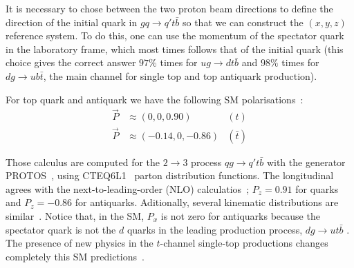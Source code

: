 It is necessary to chose between the two proton beam directions to define the direction of the initial quark in $gq \rightarrow q' t \bar{b}$ so that we can construct the $(x,y,z)$ reference system. To do this, one can use the momentum of the spectator quark in the laboratory frame, which most times follows that of the initial quark (this choice gives the correct answer $97 \%$ times for $ug\rightarrow dt\bar{b}$ and $98 \%$ times for $dg\rightarrow ub\bar{t}$, the main channel for single top and top antiquark production).

For top quark and antiquark we have the following SM polarisations~\cite{AguilarSaavedra:2010nx}:
\begin{align*}
\overrightarrow{P} &\approx (0,0,0.90) & (t) \\
\overrightarrow{P} &\approx (-0.14,0,-0.86) & (\bar{t})
\end{align*}

Those calculus are computed for the $2\rightarrow 3$ process $qg \rightarrow q't\bar{b}$ with the generator PROTOS~\cite{AguilarSaavedra:2008gt}, using CTEQ6L1~\cite{Nadolsky:2008zw} parton distribution functions. The longitudinal agrees with the next-to-leading-order (NLO) calculatios~\cite{Schwienhorst:2010je}; $P_z=0.91$ for quarks and $P_z=-0.86$ for antiquarks. Aditionally, several kinematic distributions are similar~\cite{Campbell:2009ss}. Notice that, in the SM, $P_x$ is not zero for antiquarks because the spectator quark is not the $d$ quarks in the leading production process, $dg \rightarrow ut\bar{b} $ \cite{Mahlon:1996pn}. The presence of new physics in the $t$-channel single-top productions changes completely this SM predictions~\cite{Aguilar-Saavedra:2014eqa}.

